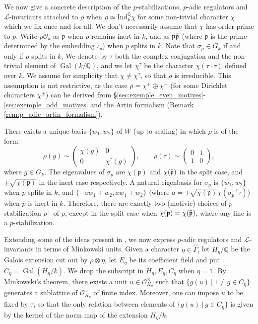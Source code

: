 \documentclass[12pt]{amsart}
\newcommand\bQ{\mathbb{Q}}
\newcommand\cL{\mathcal{L}}
\newcommand\cO{\mathcal{O}}
\newcommand\gp{\mathfrak{p}}
\newcommand{\ob}[1]{\mkern 1.5mu\overline{\mkern-1.5mu#1\mkern-1.5mu}\mkern 1.5mu}
\newcommand{\Ind}{\mathrm{Ind}}
\DeclareMathOperator{\Gal}{Gal}
\theoremstyle{defstyle}
\theoremstyle{thmstyle}
\begin{document}
We now give a concrete description of the $p$-stabilizations, $p$-adic regulators and $\cL$-invariants attached to $\rho$ when $\rho\simeq \Ind_k^\bQ \chi$ for some non-trivial character $\chi$ which we fix once and for all. We don't necessarily assume that $\chi$ has order prime to $p$. Write $p\cO_k$ as $\gp$ when $p$ remains inert in $k$, and as $\gp\ob{\gp}$ (where $\gp$ is the prime determined by the embedding $\iota_p$) when $p$ splits in $k$. Note that $\sigma_p\in G_k$ if and only if $p$ splits in $k$. We denote by $\tau$ both the complex conjugation and the non-trivial element of $\Gal(k/\bQ)$, and we let $\chi^\tau$ be the character $\chi(\tau \cdot \tau)$ defined over $k$. We assume for simplicity that $\chi\neq\chi^\tau$, so that $\rho$ is irreducible. This assumption is not restrictive, as the case $\rho=\chi^+\oplus\chi^-$ (for some Dirichlet characters $\chi^\pm$) can be derived from \S\ref{sec:exemple_even_motives}-\ref{sec:exemple_odd_motives} and the Artin formalism (Remark \ref{rem:p_adic_artin_formalism}). 

There exists a unique basis $\{w_1,w_2\}$ of $W$ (up to scaling) in which $\rho$ is of the form:
$$\rho(g)\sim \begin{pmatrix}\chi(g) & 0 \\ 0 & \chi^\tau(g)\end{pmatrix},\qquad \rho(\tau)\sim  \begin{pmatrix}0 & 1 \\ 1 & 0\end{pmatrix},$$
where $g\in G_k$. The eigenvalues of $\sigma_p$ are $\chi(\gp)$ and $\chi(\ob{\gp})$ in the split case, and $\pm \sqrt{\chi(\gp)}$ in the inert case respectively. A natural eigenbasis for $\sigma_p$ is $\{w_1,w_2\}$ when $p$ splits in $k$, and $\{-aw_1+ w_2,aw_1+w_2\}$ (where $a=\pm \sqrt{\chi(\gp)}\chi(\sigma_p^{-1}\tau)$) when $p$ is inert in $k$. Therefore, there are exactly two (motivic) choices of $p$-stabilization $\rho^+$ of $\rho$, except in the split case when $\chi(\gp)=\chi(\ob{\gp})$, where any line is a $p$-stabilization. 

Extending some of the ideas present in \cite[§1]{betinadimitrovKatz}, we now express $p$-adic regulators and $\cL$-invariants in terms of Minkowski units. Given a character $\eta\in\widehat{\Gamma}$, let $H_\eta/\bQ$ be the Galois extension cut out by $\rho\otimes\eta$, let $E_\eta$ be its coefficient field and put $C_\eta=\Gal(H_\eta/k)$. We drop the subscript in $H_\eta,E_\eta,C_\eta$ when $\eta=\mathds{1}$. By Minkowski's theorem, there exists a unit $u\in \cO_{H_\eta}^\times$ such that $\{g(u)\ |\ 1\neq g\in C_\eta\}$ generates a sublattice of $\cO_{H_\eta}^\times$ of finite index. Moreover, one can impose $u$ to be fixed by $\tau$, so that the only relation between elements of $\{g(u)\ |\ g\in C_\eta\}$ is given by the kernel of the norm map of the extension ${H_\eta/k}$. 
\end{document}
